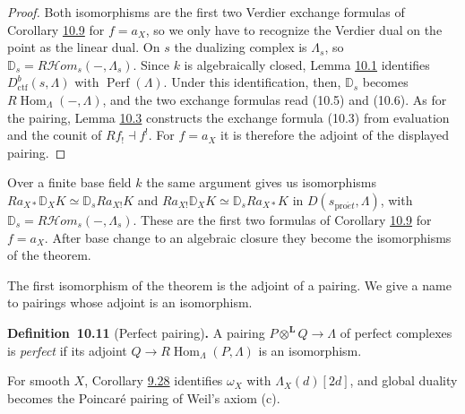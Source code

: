 \documentclass[11pt]{article}
\newenvironment{bpstatement}[2]{\par\addvspace{0.6\baselineskip}\noindent\textbf{#1}#2\textbf{.}\enspace\ignorespaces}
  {\par\addvspace{0.4\baselineskip}}
\providecommand{\cHom}{}\renewcommand{\cHom}{R\mathcal{H}\!om}
\begin{document}
\begin{proof}[{Proof}]\label{bp133}%
Both isomorphisms are the first two Verdier exchange formulas of Corollary \hyperref[bp128]{10.9} for \(f=a_X\), so we only have to recognize the Verdier dual on the point as the linear dual. On \(s\) the dualizing complex is \(\Lambda_s\), so \(\mathbb D_s=\cHom_s(-,\Lambda_s)\). Since \(k\) is algebraically closed, Lemma \hyperref[bp105]{10.1} identifies \(D^b_{\mathrm{ctf}}(s,\Lambda)\) with \(\operatorname{Perf}(\Lambda)\). Under this identification, then, \(\mathbb D_s\) becomes \(R\!\operatorname{Hom}_\Lambda(-,\Lambda)\), and the two exchange formulas read (10.5) and (10.6). As for the pairing, Lemma \hyperref[bp110]{10.3} constructs the exchange formula (10.3) from evaluation and the counit of \(Rf_!\dashv f^!\). For \(f=a_X\) it is therefore the adjoint of the displayed pairing.
\end{proof}

\label{bp134}%
Over a finite base field \(k\) the same argument gives us isomorphisms \(Ra_{X*}\mathbb D_XK\simeq\mathbb D_sRa_{X!}K\) and \(Ra_{X!}\mathbb D_XK\simeq\mathbb D_sRa_{X*}K\) in \(D(s_{\mathrm{pro}\acute{e}t},\Lambda)\), with \(\mathbb D_s=\cHom_s(-,\Lambda_s)\). These are the first two formulas of Corollary \hyperref[bp128]{10.9} for \(f=a_X\). After base change to an algebraic closure they become the isomorphisms of the theorem.

The first isomorphism of the theorem is the adjoint of a pairing. We give a name to pairings whose adjoint is an isomorphism.

\label{bp135}%
\begin{bpstatement}{Definition~10.11}{ (Perfect pairing)}
A pairing \(P\otimes^{\mathbf L}Q\to\Lambda\) of perfect complexes is \emph{perfect} if its adjoint \(Q\to R\!\operatorname{Hom}_\Lambda(P,\Lambda)\) is an isomorphism.
\end{bpstatement}

\label{bp136}%
For smooth \(X\), Corollary \hyperref[bp98]{9.28} identifies \(\omega_X\) with \(\Lambda_X(d)[2d]\), and global duality becomes the Poincaré pairing of Weil's axiom (c).
\end{document}
